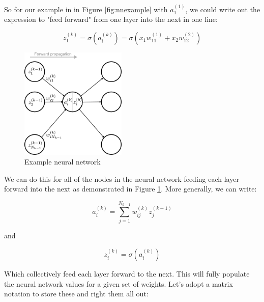 \documentclass{article}
\begin{document}
So for our example in in Figure \ref{fig:nnexample} with $a_1^{(1)}$, we could write out the expression to "feed forward" from one layer into the next in one line:

\begin{equation}
    z_1^{(k)} = \sigma(a_i^{(k)}) = \sigma(x_1 w_{11}^{(1)} + x_2 w_{12}^{(2)})
\end{equation}

\begin{figure}[h]
\centering
\includegraphics[width=0.45\textwidth]{./neural_networks_local_forward_propagation.eps}
\caption{Example neural network}
\label{fig:ff}
\end{figure}

We can do this for all of the nodes in the neural network feeding each layer forward into the next as demonstrated in Figure \ref{fig:ff}. More generally, we can write:

\begin{equation}
    a_i^{(k)} = \sum_{j=1}^{N_{k-1}} w_{ij}^{(k)} z_j^{(k-1)} 
\end{equation}

and

\begin{equation}
    z_i^{(k)} = \sigma(a_i^{(k)})
\end{equation}

Which collectively feed each layer forward to the next. This will fully populate the neural network values for a given set of weights. Let's adopt a matrix notation to store these and right them all out:
\end{document}
